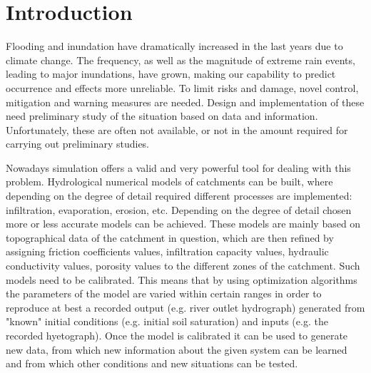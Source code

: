 \chapter{Introduction}
\label{chp:introduction}

\newcommand{\keyword}[1]{\textbf{#1}}
\newcommand{\tabhead}[1]{\textbf{#1}}
\newcommand{\code}[1]{\texttt{#1}}
\newcommand{\file}[1]{\texttt{\bfseries#1}}
\newcommand{\option}[1]{\texttt{\itshape#1}}




Flooding and inundation have dramatically increased in the last years due to climate change.
The frequency, as well as the magnitude of extreme rain events, leading to major inundations, have grown, making our capability to predict occurrence and effects more unreliable.
To limit risks and damage, novel control, mitigation and warning measures are needed.
Design and implementation of these need preliminary study of the situation based on data and information.
Unfortunately, these are often not available, or not in the amount required for carrying out preliminary studies.

Nowadays simulation offers a valid and very powerful tool for dealing with this problem.
Hydrological numerical models of catchments can be built, where depending on the degree of detail required different processes are implemented: infiltration, evaporation, erosion, etc.
Depending on the degree of detail chosen more or less accurate models can be achieved.
These models are mainly based on topographical data of the catchment in question, which are then refined by assigning friction coefficients values, infiltration capacity values, hydraulic conductivity values, porosity values to the different zones of the catchment.
Such models need to be calibrated.
This means that by using optimization algorithms the parameters of the model are varied within certain ranges in order to reproduce at best a recorded output (e.g. river outlet hydrograph) generated from "known" initial conditions (e.g. initial soil saturation) and inputs (e.g. the recorded hyetograph).
Once the model is calibrated it can be used to generate new data, from which new information about the given system can be learned and from which other conditions and new situations can be tested.

